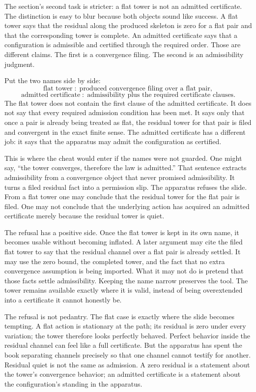 The section's second task is stricter: a flat tower is not an admitted
certificate. The distinction is easy to blur because both objects sound like
success. A flat tower says that the residual along the produced skeleton is
zero for a flat pair and that the corresponding tower is complete. An admitted
certificate says that a configuration is admissible and certified through the
required order. Those are different claims. The first is a convergence filing.
The second is an admissibility judgment.

Put the two names side by side:
\[
  \text{flat tower}
  \;:\;
  \text{produced convergence filing over a flat pair},
\]
\[
  \text{admitted certificate}
  \;:\;
  \text{admissibility plus the required certificate clauses}.
\]
The flat tower does not contain the first clause of the admitted certificate.
It does not say that every required admission condition has been met. It says
only that once a pair is already being treated as flat, the residual tower for
that pair is filed and convergent in the exact finite sense. The admitted
certificate has a different job: it says that the apparatus may admit the
configuration as certified.

This is where the cheat would enter if the names were not guarded. One might
say, ``the tower converges, therefore the law is admitted.'' That sentence
extracts admissibility from a convergence object that never promised
admissibility. It turns a filed residual fact into a permission slip. The
apparatus refuses the slide. From a flat tower one may conclude that the
residual tower for the flat pair is filed. One may not conclude that the
underlying action has acquired an admitted certificate merely because the
residual tower is quiet.

The refusal has a positive side. Once the flat tower is kept in its own name,
it becomes usable without becoming inflated. A later argument may cite the
filed flat tower to say that the residual channel over a flat pair is already
settled. It may use the zero bound, the completed tower, and the fact that no
extra convergence assumption is being imported. What it may not do is pretend
that those facts settle admissibility. Keeping the name narrow preserves the
tool. The tower remains available exactly where it is valid, instead of being
overextended into a certificate it cannot honestly be.

The refusal is not pedantry. The flat case is exactly where the slide becomes
tempting. A flat action is stationary at the path; its residual is zero under
every variation; the tower therefore looks perfectly behaved. Perfect behavior
inside the residual channel can feel like a full certificate. But the apparatus
has spent the book separating channels precisely so that one channel cannot
testify for another. Residual quiet is not the same as admission. A zero
residual is a statement about the tower's convergence behavior; an admitted
certificate is a statement about the configuration's standing in the apparatus.

